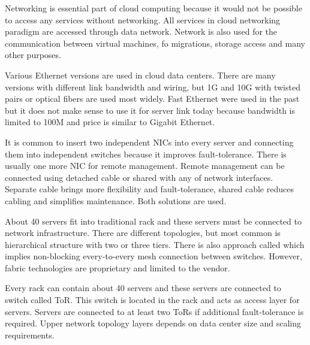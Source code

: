 
Networking is essential part of cloud computing because it would not be possible to access any services without networking. All services in cloud networking paradigm are accessed through data network. Network is also used for the communication between virtual machines, fo migrations, storage access and many other purposes.


Various Ethernet versions are used in cloud data centers. There are many versions with different link bandwidth and wiring, but 1G and 10G with twisted pairs or optical fibers are used most widely. Fast Ethernet were used in the past but it does not make sense to use it for server link today because bandwidth is limited to 100M and price is similar to Gigabit Ethernet.

It is common to insert two independent \Ac{NIC}s into every server and connecting them into independent switches because it improves fault-tolerance. There is usually one more \Ac{NIC} for remote management. Remote management can be connected using detached cable or shared with any of network interfaces. Separate cable brings more flexibility and fault-tolerance, shared cable reduces cabling and simplifies maintenance. Both solutions are used. 

About 40 servers fit into traditional rack and these servers must be connected to network infrastructure. There are different topologies, but most common is hierarchical structure with two or three tiers. \cite{survey-architectures} There is also approach called  which implies non-blocking every-to-every mesh connection between switches. However, fabric technologies are proprietary and limited to the vendor. 

Every rack can contain about 40 servers and these servers are connected to switch called \Ac{ToR}. This switch is located in the rack and acts as access layer for servers. Servers are connected to at least two \Ac{ToR}s if additional fault-tolerance is required. Upper network topology layers depends on data center size and scaling requirements. 


